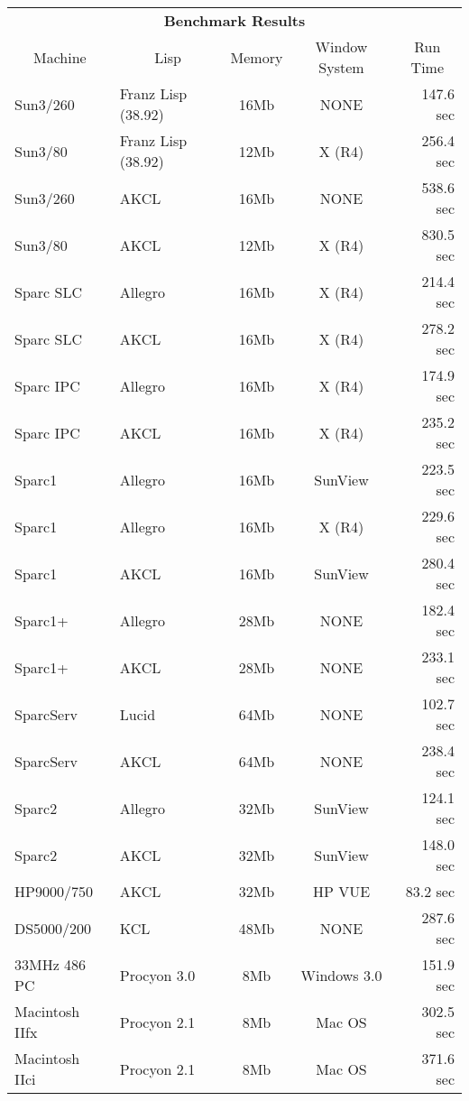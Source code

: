{\begin{center}
\begin{tabular}{|l|l|c|c|r|}
\hline
\multicolumn{5}{|c|}{\bf Benchmark Results} \\
\multicolumn{1}{|c}{\sf Machine} & 
\multicolumn{1}{c}{\sf Lisp} & 
\multicolumn{1}{c}{\sf Memory} & 
\multicolumn{1}{c}{\sf Window System} & 
\multicolumn{1}{c|}{\sf Run Time} \\
\hline
Sun3/260       & Franz Lisp (38.92) &  16Mb  &    NONE       & 147.6 sec \\
Sun3/80        & Franz Lisp (38.92) &  12Mb  &    X (R4)     & 256.4 sec \\
Sun3/260       & AKCL               &  16Mb  &    NONE       & 538.6 sec \\
Sun3/80        & AKCL               &  12Mb  &    X (R4)     & 830.5 sec \\
Sparc SLC      & Allegro            &  16Mb  &    X (R4)     & 214.4 sec \\
Sparc SLC      & AKCL               &  16Mb  &    X (R4)     & 278.2 sec \\
Sparc IPC      & Allegro            &  16Mb  &    X (R4)     & 174.9 sec \\
Sparc IPC      & AKCL               &  16Mb  &    X (R4)     & 235.2 sec \\
Sparc1         & Allegro            &  16Mb  &   SunView     & 223.5 sec \\
Sparc1         & Allegro            &  16Mb  &    X (R4)     & 229.6 sec \\
Sparc1         & AKCL               &  16Mb  &   SunView     & 280.4 sec \\
Sparc1+        & Allegro            &  28Mb  &    NONE       & 182.4 sec \\
Sparc1+        & AKCL               &  28Mb  &    NONE       & 233.1 sec \\
SparcServ      & Lucid              &  64Mb  &    NONE       & 102.7 sec \\
SparcServ      & AKCL               &  64Mb  &    NONE       & 238.4 sec \\
Sparc2         & Allegro            &  32Mb  &   SunView     & 124.1 sec \\
Sparc2         & AKCL               &  32Mb  &   SunView     & 148.0 sec \\
HP9000/750     & AKCL               &  32Mb  &    HP VUE     & 83.2 sec \\
DS5000/200     & KCL                &  48Mb  &    NONE       & 287.6 sec \\
33MHz 486 PC   & Procyon 3.0        &   8Mb  &   Windows 3.0 & 151.9 sec \\
Macintosh IIfx & Procyon 2.1        &   8Mb  &   Mac OS      & 302.5 sec \\
Macintosh IIci & Procyon 2.1        &   8Mb  &   Mac OS      & 371.6 sec \\
\hline
\end{tabular}
\end{center}

}
